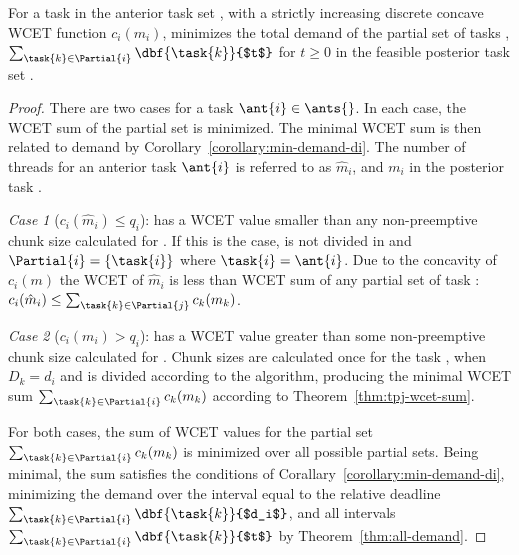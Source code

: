 \begin{theorem}
  \label{thm:tpj-min-demand}
  For a task  in the anterior task set \ants{}, with a
  strictly increasing discrete concave WCET function ${c_i(m_i)}$, \tpj{}
  minimizes the total demand of the partial set of tasks ,
  ${\sum_{\task{k} \in \Partial{i}} \dbf{\task{k}}{$t$}}$ for ${t \ge 0}$
  in the feasible posterior task set \tasks{}.

  \begin{proof} There are two cases for a task
    ${\ant{i} \in \ants{}}$. In each case, the WCET sum of the partial set
     is minimized. The minimal WCET sum is then related to
    demand by Corollary~\ref{corollary:min-demand-di}. The number of
    threads for an anterior task ${\ant{i}}$ is referred to as
    ${\hat{m}_i}$, and ${m_i}$ in the posterior task .

    \emph{Case 1} (${c_i(\hat{m}_i) \le q_i}$):  has a WCET
    value smaller than any non-preemptive chunk size calculated for
    . If this is the case,  is not divided 
    in \tasks{} and ${\Partial{i} = \{\task{i}\}}$ where
    ${\task{i} = \ant{i}}$.
    Due to the concavity of ${c_i(m)}$ the WCET of ${\hat{m}_i}$ is
    less than WCET sum of any partial set  of task :
    ${c_i(\hat{m}_i) \le \sum_{\task{k} \in \Partial{j}} c_k(m_k)}$.

    \emph{Case 2} (${c_i(m_i) > q_i}$):  has a WCET value
    greater than some non-preemptive chunk size calculated for
    . Chunk sizes are calculated once for the task 
    , when ${D_k = d_i}$ and  is divided
    according to the \texdivide{} algorithm, producing the minimal
    WCET sum ${\sum_{\task{k} \in \Partial{i}} c_k(m_k)}$ according to
    Theorem~\ref{thm:tpj-wcet-sum}.


    For both cases, the sum of WCET values for the partial set
    ${\sum_{\task{k} \in \Partial{i}} c_k(m_k)}$ is minimized over all
    possible partial sets. Being minimal, the sum satisfies the conditions of
    Corallary~\ref{corollary:min-demand-di}, minimizing the demand  
    over the interval equal to the relative deadline
    ${\sum_{\task{k} \in \Partial{i}} \dbf{\task{k}}{$d_i$}}$,
    and all intervals
    ${\sum_{\task{k} \in \Partial{i}} \dbf{\task{k}}{$t$}}$
    by Theorem~\ref{thm:all-demand}.
  \end{proof}


\end{theorem}

